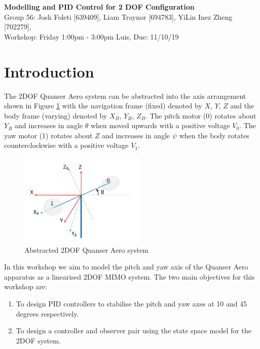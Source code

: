 \documentclass[11pt]{article}
\begin{document}

\clearpage
\setcounter{page}{1}

\begin{center}
\textbf{\Large{Modelling and PID Control for 2 DOF Configuration}}\\
Group 56: Josh Foleti [639409], Liam Traynor [694783], YiLin Inez Zheng [702279], \\
Workshop: Friday 1:00pm - 3:00pm Luis, Due: 11/10/19  
\end{center}

\section{Introduction}
The 2DOF Quanser Aero system can be abstracted into the axis arrangement shown in Figure \ref{fig:W4Quanser} with the navigation frame (fixed) denoted by $X$, $Y$, $Z$ and the body frame (varying) denoted by $X_B$, $Y_B$, $Z_B$. The pitch motor (0) rotates about $Y_B$ and increases in angle $\theta$ when moved upwards with a positive voltage $V_0$. The yaw motor (1) rotates about $Z$ and increases in angle $\psi$ when the body rotates counterclockwise with a positive voltage $V_1$.
\begin{figure}[H]
    \centering
    \includegraphics[width=6cm]{W4Quanser.png}
    \caption{Abstracted 2DOF Quanser Aero system}
    \label{fig:W4Quanser}
\end{figure}
In this workshop we aim to model the pitch and yaw axis of the Quanser Aero apparatus as a linearised 2DOF MIMO system. The two main objectives for this workshop are:
\begin{enumerate}
    \item To design PID controllers to stabilise the pitch and yaw axes at 10 and 45 degrees respectively.
    \item To design a controller and observer pair using the state space model for the 2DOF system.
\end{enumerate}

\end{document}
